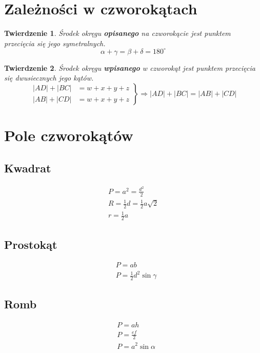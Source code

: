 \documentclass{article}
\numberwithin{equation}{section}
\newtheorem{theorem}{Twierdzenie}[section]
\begin{document}
  \section{Zależności w czworokątach}
    \begin{theorem}
      Środek okręgu \textbf{opisanego} na czworokącie jest punktem przecięcia się jego symetralnych.
      \begin{equation}
        \alpha + \gamma = \beta + \delta = 180^\circ
      \end{equation}
    \end{theorem}
    \begin{theorem}
      Środek okręgu \textbf{wpisanego} w czworokąt jest punktem przecięcia się dwusiecznych jego kątów.
      \begin{equation}
        \left.
          \begin{aligned}
            |AD| + |BC| &= w+x+y+z\\
            |AB| + |CD| &= w+x+y+z
          \end{aligned}
        \right\}
        \Rightarrow
        |AD| + |BC| = |AB| + |CD|
      \end{equation}
    \end{theorem}

  \section{Pole czworokątów}
    \subsection{Kwadrat}
      \begin{gather}
        P = a^2 = \frac{d^2}{2}\\
        R = \frac 12d = \frac 12a\sqrt2\\
        r = \frac 12a
      \end{gather}
    \subsection{Prostokąt}
      \begin{align}
        &P = ab\\
        &P = \frac 12d^2\sin\gamma
      \end{align}
    \subsection{Romb}
      \begin{align}
        &P = ah\\
        &P = \frac{ef}{2}\\
        &P = a^2\sin\alpha
      \end{align}
\end{document}
